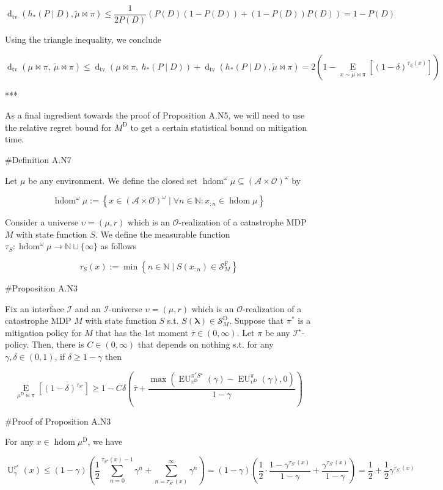 \documentclass[a4paper]{article}
\newcommand{\AP}[1]{\left(#1\right)}
\newcommand{\AB}[1]{\left[#1\right]}
\newcommand{\AC}[1]{\left\{#1\right\}}
\newcommand{\Ea}[2]{\underset{#1}{\operatorname{E}}\AB{#2}}
\newcommand{\Dtva}[1]{\operatorname{d}_{\text{tv}}\AP{#1}}
\newcommand{\Nats}{\mathbb{N}}
\newcommand{\Estr}{\boldsymbol{\lambda}}
\newcommand{\Ob}{\mathcal{O}}
\newcommand{\A}{\mathcal{A}}
\newcommand{\St}{\mathcal{S}}
\newcommand{\In}{\mathcal{I}}
\DeclareMathOperator{\HD}{hdom}
\newcommand{\RMD}{\mathrm{D}}
\newcommand{\RMF}{\mathrm{F}}
\newcommand{\SF}{\St^{\RMF}}
\newcommand{\SD}{\St^{\RMD}}
\newcommand{\MD}{M^{\RMD}}
\newcommand{\Ut}{\operatorname{U}}
\newcommand{\EU}{\operatorname{EU}}
\begin{document}
$$\Dtva{h_*\AP{P \mid D},\tilde{\mu}\bowtie\pi} \leq \frac{1}{2P(D)}\AP{P(D)\AP{1-P(D)} + \AP{1-P(D)}P(D)}=1-P(D)$$

Using the triangle inequality, we conclude

$$\Dtva{\mu\bowtie\pi,\ \tilde{\mu}\bowtie\pi}\leq\Dtva{\mu\bowtie\pi,\ h_*\AP{P \mid D}}+\Dtva{h_*\AP{P \mid D},\tilde{\mu}\bowtie\pi}=2\AP{1-\Ea{x\sim\tilde{\mu}\bowtie\pi}{\AP{1-\delta}^{\tau_S(x)}}}$$

***

As a final ingredient towards the proof of Proposition A.N5, we will need to use the relative regret bound for $\MD$ to get a certain statistical bound on mitigation time.

\#Definition A.N7

Let $\mu$ be any environment. We define the closed set $\HD^\omega\mu \subseteq (\A \times \Ob)^\omega$ by

$$\HD^\omega\mu := \AC{x \in (\A \times \Ob)^\omega \mid \forall n \in \Nats: x_{:n} \in \HD{\mu}}$$

Consider a universe $\upsilon=(\mu,r)$ which is an $\Ob$-realization of a catastrophe MDP $M$ with state function $S$. We define the measurable function $\tau_S: \HD^\omega{\mu} \rightarrow \Nats \sqcup \{\infty\}$ as follows

$$\tau_S(x) := \min\AC{n \in \Nats \mid S\AP{x_{:n}} \in \SF_M}$$

\#Proposition A.N3

Fix an interface $\In$ and an $\In$-universe $\upsilon=(\mu,r)$ which is an $\Ob$-realization of a catastrophe MDP $M$ with state function $S$ s.t. $S(\Estr)\in\SD_M$. Suppose that $\pi^*$ is a mitigation policy for $M$ that has the 1st moment $\bar{\tau}\in(0,\infty)$. Let $\pi$ be any $\In^\star$-policy. Then, there is $C\in(0,\infty)$ that depends on nothing s.t. for any $\gamma,\delta\in(0,1)$, if $\delta \geq 1-\gamma$ then

$$\Ea{\mu^\RMD\bowtie\pi}{(1-\delta)^{\tau_{S^\star}}} \geq 1 - C\delta\AP{\bar{\tau}+\frac{\max\AP{\EU_{\upsilon^{\RMD}}^{\pi^* S^\star}(\gamma)-\EU_{\upsilon^{\RMD}}^{\pi}(\gamma),0}}{1-\gamma}}$$

\#Proof of Proposition A.N3

For any $x \in \HD{\mu^\RMD}$, we have

$$\Ut^{r^\star}_\gamma(x) \leq (1-\gamma)\AP{\frac{1}{2}\sum_{n=0}^{\tau_{S^\star}(x)-1}{\gamma^n} + \sum_{n=\tau_{S^\star}(x)}^\infty \gamma^n} = (1-\gamma)\AP{\frac{1}{2} \cdot \frac{1 - \gamma^{\tau_{S^\star}(x)}}{1-\gamma}+\frac{\gamma^{\tau_{S^\star}(x)}}{1-\gamma}}=\frac{1}{2}+\frac{1}{2}\gamma^{\tau_{S^\star}(x)}$$
\end{document}
